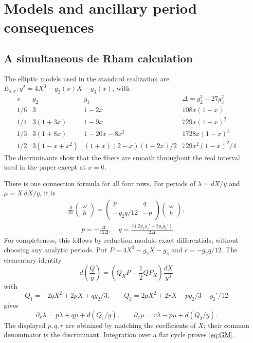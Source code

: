 \section{Models and ancillary period consequences}\label{rev:period-models}

\subsection{A simultaneous de Rham calculation}
The elliptic models used in the standard realization are
$E_{s,x}:y^2=4X^3-g_2(x)X-g_3(x)$, with
\[
\begin{array}{c|c|c|c}
s&g_2&g_3&\Delta=g_2^3-27g_3^2\\ \hline
1/6&3&1-2x&108x(1-x)\\
1/4&3(1+3x)&1-9x&729x(1-x)^2\\
1/3&3(1+8x)&1-20x-8x^2&1728x(1-x)^3\\
1/2&3(1-x+x^2)&(1+x)(2-x)(1-2x)/2&729x^2(1-x)^2/4
\end{array}
\]
The discriminants show that the fibers are smooth throughout the
real interval used in the paper except at $x=0$.

There is one connection formula for all four rows. For periods of
$\lambda=dX/y$ and $\mu=X\,dX/y$, it is
\begin{equation}\label{eq:GM}
 \begin{gathered}
 \frac d{dx}\begin{pmatrix}\omega\\h\end{pmatrix}
 =\begin{pmatrix}p&q\\-g_2q/12&-p\end{pmatrix}
     \begin{pmatrix}\omega\\h\end{pmatrix},\\
 \qquad p=-\frac{\Delta'}{12\Delta},\quad
 q=\frac{3(2g_2g_3'-3g_3g_2')}{2\Delta}.
 \end{gathered}
\end{equation}
For completeness, this follows by reduction modulo exact
differentials, without choosing any analytic periods. Put
$P=4X^3-g_2X-g_3$ and $r=-g_2q/12$. The elementary identity
\[
 d\left(\frac{Q}{y}\right)
 =\left(Q_XP-\frac12QP_X\right)\frac{dX}{y^3}
\]
with
\[
 Q_1=-2qX^2+2pX+qg_2/3,\qquad
 Q_2=2pX^2+2rX-pg_2/3-g_2'/12
\]
gives
\[
 \partial_x\lambda=p\lambda+q\mu+d(Q_1/y),\qquad
 \partial_x\mu=r\lambda-p\mu+d(Q_2/y).
\]
The displayed $p,q,r$ are obtained by matching the coefficients of
$X$; their common denominator is the discriminant. Integration over
a flat cycle proves \eqref{eq:GM}.

